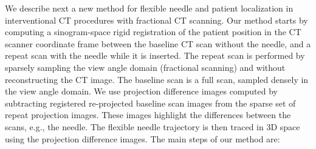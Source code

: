 We describe next a new method for flexible needle and patient localization in interventional CT procedures with fractional CT scanning. Our method starts by computing a sinogram-space rigid registration of the patient position in the CT scanner coordinate frame between the baseline CT scan without the needle, and a repeat scan with the needle while it is inserted. The repeat scan is performed by sparsely sampling the view angle domain (fractional scanning) and without reconstructing the CT image. The baseline scan is a full scan, sampled densely in the view angle domain. We use projection difference images computed by subtracting registered re-projected baseline scan images from the sparse set of repeat projection images. These images highlight the differences between the scans, e.g., the needle. The flexible needle trajectory is then traced in 3D space using the projection difference images. The main steps of our method are:

